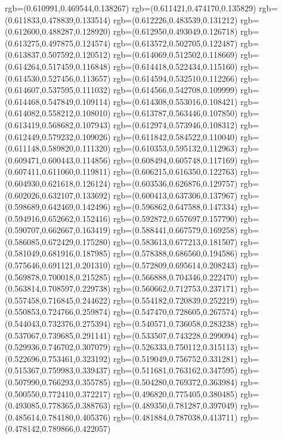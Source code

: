 {{{			rgb=(0.610991,0.469544,0.138267)
			rgb=(0.611421,0.474170,0.135829)
			rgb=(0.611833,0.478839,0.133514)
			rgb=(0.612226,0.483539,0.131212)
			rgb=(0.612600,0.488287,0.128920)
			rgb=(0.612950,0.493049,0.126718)
			rgb=(0.613275,0.497875,0.124574)
			rgb=(0.613572,0.502705,0.122487)
			rgb=(0.613837,0.507592,0.120512)
			rgb=(0.614069,0.512502,0.118669)
			rgb=(0.614264,0.517459,0.116848)
			rgb=(0.614418,0.522434,0.115160)
			rgb=(0.614530,0.527456,0.113657)
			rgb=(0.614594,0.532510,0.112266)
			rgb=(0.614607,0.537595,0.111032)
			rgb=(0.614566,0.542708,0.109999)
			rgb=(0.614468,0.547849,0.109114)
			rgb=(0.614308,0.553016,0.108421)
			rgb=(0.614082,0.558212,0.108010)
			rgb=(0.613787,0.563446,0.107850)
			rgb=(0.613419,0.568682,0.107943)
			rgb=(0.612974,0.573946,0.108312)
			rgb=(0.612449,0.579232,0.109026)
			rgb=(0.611842,0.584522,0.110040)
			rgb=(0.611148,0.589820,0.111320)
			rgb=(0.610353,0.595132,0.112963)
			rgb=(0.609471,0.600443,0.114856)
			rgb=(0.608494,0.605748,0.117169)
			rgb=(0.607411,0.611060,0.119811)
			rgb=(0.606215,0.616350,0.122763)
			rgb=(0.604930,0.621618,0.126124)
			rgb=(0.603536,0.626876,0.129757)
			rgb=(0.602026,0.632107,0.133692)
			rgb=(0.600413,0.637306,0.137967)
			rgb=(0.598689,0.642469,0.142496)
			rgb=(0.596862,0.647588,0.147334)
			rgb=(0.594916,0.652662,0.152416)
			rgb=(0.592872,0.657697,0.157790)
			rgb=(0.590707,0.662667,0.163419)
			rgb=(0.588441,0.667579,0.169258)
			rgb=(0.586085,0.672429,0.175280)
			rgb=(0.583613,0.677213,0.181507)
			rgb=(0.581049,0.681916,0.187985)
			rgb=(0.578388,0.686560,0.194586)
			rgb=(0.575646,0.691121,0.201310)
			rgb=(0.572809,0.695614,0.208243)
			rgb=(0.569878,0.700018,0.215285)
			rgb=(0.566888,0.704346,0.222470)
			rgb=(0.563814,0.708597,0.229738)
			rgb=(0.560662,0.712753,0.237171)
			rgb=(0.557458,0.716845,0.244622)
			rgb=(0.554182,0.720839,0.252219)
			rgb=(0.550853,0.724766,0.259874)
			rgb=(0.547470,0.728605,0.267574)
			rgb=(0.544043,0.732376,0.275394)
			rgb=(0.540571,0.736058,0.283238)
			rgb=(0.537067,0.739685,0.291141)
			rgb=(0.533507,0.743228,0.299094)
			rgb=(0.529936,0.746702,0.307079)
			rgb=(0.526333,0.750112,0.315113)
			rgb=(0.522696,0.753461,0.323192)
			rgb=(0.519049,0.756752,0.331281)
			rgb=(0.515367,0.759983,0.339437)
			rgb=(0.511681,0.763162,0.347595)
			rgb=(0.507990,0.766293,0.355785)
			rgb=(0.504280,0.769372,0.363984)
			rgb=(0.500550,0.772410,0.372217)
			rgb=(0.496820,0.775405,0.380485)
			rgb=(0.493085,0.778365,0.388763)
			rgb=(0.489350,0.781287,0.397049)
			rgb=(0.485614,0.784180,0.405376)
			rgb=(0.481884,0.787038,0.413711)
			rgb=(0.478142,0.789866,0.422057)
}}}
